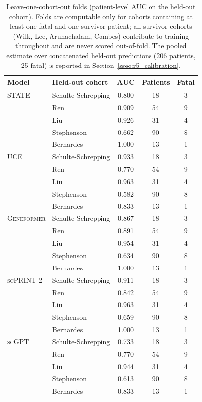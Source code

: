 \documentclass[11pt,a4paper]{article}
\newcommand{\model}[1]{\textsc{#1}}
\begin{document}
\begin{table}[t]
\centering
\caption{Leave-one-cohort-out folds (patient-level AUC on the held-out
cohort). Folds are computable only for cohorts containing at least one
fatal and one survivor patient; all-survivor cohorts (Wilk, Lee,
Arunachalam, Combes) contribute to training throughout and are never scored
out-of-fold. The pooled estimate over concatenated held-out predictions
(206 patients, 25 fatal) is reported in
Section~\ref{ssec:r5_calibration}.}
\label{tab:lobo_folds}
\small
\begin{tabular}{llccc}
\toprule
\textbf{Model} & \textbf{Held-out cohort} & \textbf{AUC} & \textbf{Patients} & \textbf{Fatal} \\
\midrule
\model{STATE} & Schulte-Schrepping & 0.800 & 18 & 3 \\
 & Ren & 0.909 & 54 & 9 \\
 & Liu & 0.926 & 31 & 4 \\
 & Stephenson & 0.662 & 90 & 8 \\
 & Bernardes & 1.000 & 13 & 1 \\
\midrule
\model{UCE} & Schulte-Schrepping & 0.933 & 18 & 3 \\
 & Ren & 0.770 & 54 & 9 \\
 & Liu & 0.963 & 31 & 4 \\
 & Stephenson & 0.582 & 90 & 8 \\
 & Bernardes & 0.833 & 13 & 1 \\
\midrule
\model{Geneformer} & Schulte-Schrepping & 0.867 & 18 & 3 \\
 & Ren & 0.891 & 54 & 9 \\
 & Liu & 0.954 & 31 & 4 \\
 & Stephenson & 0.634 & 90 & 8 \\
 & Bernardes & 1.000 & 13 & 1 \\
\midrule
\model{scPRINT-2} & Schulte-Schrepping & 0.911 & 18 & 3 \\
 & Ren & 0.842 & 54 & 9 \\
 & Liu & 0.963 & 31 & 4 \\
 & Stephenson & 0.659 & 90 & 8 \\
 & Bernardes & 1.000 & 13 & 1 \\
\midrule
\model{scGPT} & Schulte-Schrepping & 0.733 & 18 & 3 \\
 & Ren & 0.770 & 54 & 9 \\
 & Liu & 0.944 & 31 & 4 \\
 & Stephenson & 0.613 & 90 & 8 \\
 & Bernardes & 0.833 & 13 & 1 \\
\bottomrule
\end{tabular}
\end{table}
\end{document}
